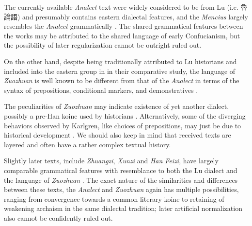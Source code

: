 \documentclass[UTF8, a4paper, oneside, scheme=plain, 12pt]{ctexrep}
\newcommand*{\citepage}[1]{p.~{#1}}
\newcommand*{\citepages}[1]{pp.~{#1}}
\newcommand{\form}[1]{\emph{#1}}
\newcommand{\work}[1]{\textit{#1}}
\begin{document}
The currently available \work{Analect} text were widely considered to be from Lu (i.e. 魯論語) and presumably contains eastern dialectal features,
and the \work{Mencius} largely resembles the \work{Analect} grammatically \citep[\citepages{63-77,90}]{karlgren1936zuozhuan}.
The shared grammatical features between the works may be attributed to the shared language of early Confucianism,
but the possibility of later regularization cannot be outright ruled out. 

On the other hand, despite being traditionally attributed to Lu historians and included into the eastern group in \citet{bian2017dialect} in their comparative study,
the language of \work{Zuozhuan} is well known to be different from that of the \work{Analect} in terms of the syntax of prepositions, conditional markers, and demonstratives \citep[\citepages{63-77}]{karlgren1936zuozhuan}.

The peculiarities of \work{Zuozhuan} may indicate existence of yet another dialect, possibly a pre-Han koine used by historians \citep[\citepage{3}]{pulleyblank1995outline}. 
Alternatively, some of the diverging behaviors observed by Karlgren, like choices of prepositions, may just be due to historical development \citep{venture2020preposition}.
We should also keep in mind that received texts are layered and often have a rather complex textual history.

Slightly later texts, include \work{Zhuangzi}, \work{Xunzi} and \work{Han Feizi}, have largely comparable grammatical features with resemblance to both the Lu dialect and the language of \work{Zuozhuan} \citep[\citepages{92-93}]{karlgren1936zuozhuan}.
The exact nature of the similarities and differences between these texts, the \work{Analect} and \form{Zuozhuan} again has multiple possibilities, ranging from
convergence towards a common literary koine \citep[\citepage{3}]{pulleyblank1995outline}
to retaining of weakening archaism in the same dialectal tradition;
later artificial normalization also cannot be confidently ruled out.
\end{document}

